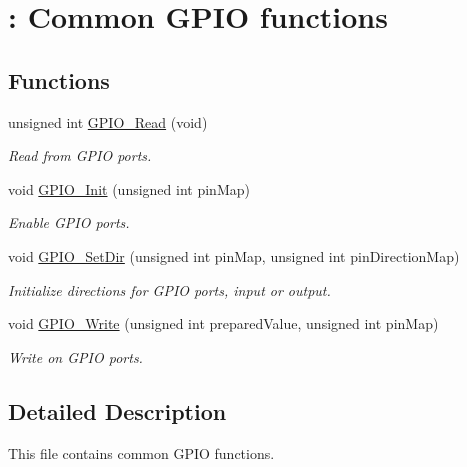 \hypertarget{group___g_p_i_o}{\section{\+: Common G\+P\+I\+O functions}
\label{group___g_p_i_o}
}
\subsection*{Functions}
\begin{DoxyCompactItemize}
\item 
unsigned int \hyperlink{group___g_p_i_o_ga23bfb990afc96634878279171ac71c4d}{G\+P\+I\+O\+\_\+\+Read} (void)
\begin{DoxyCompactList}\small\item\em Read from G\+P\+I\+O ports. \end{DoxyCompactList}\item 
void \hyperlink{group___g_p_i_o_ga228420e7e25c0e0bbdeda350cb10f776}{G\+P\+I\+O\+\_\+\+Init} (unsigned int pin\+Map)
\begin{DoxyCompactList}\small\item\em Enable G\+P\+I\+O ports. \end{DoxyCompactList}\item 
void \hyperlink{group___g_p_i_o_ga445e3d89007a8f8b228a5a5c28c6eb68}{G\+P\+I\+O\+\_\+\+Set\+Dir} (unsigned int pin\+Map, unsigned int pin\+Direction\+Map)
\begin{DoxyCompactList}\small\item\em Initialize directions for G\+P\+I\+O ports, input or output. \end{DoxyCompactList}\item 
void \hyperlink{group___g_p_i_o_ga4d14eef4b333507cf0867ea42b6200cd}{G\+P\+I\+O\+\_\+\+Write} (unsigned int prepared\+Value, unsigned int pin\+Map)
\begin{DoxyCompactList}\small\item\em Write on G\+P\+I\+O ports. \end{DoxyCompactList}\end{DoxyCompactItemize}


\subsection{Detailed Description}
This file contains common G\+P\+I\+O functions. 


